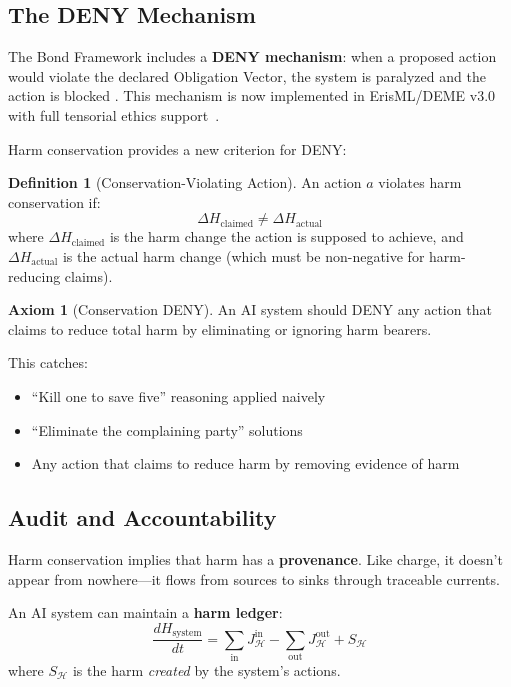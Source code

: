\documentclass[12pt,letterpaper]{article}
\theoremstyle{definition}
\newtheorem{definition}[theorem]{Definition}
\newtheorem{axiom}{Axiom}
\theoremstyle{remark}
\newcommand{\harm}{\mathcal{H}}
\begin{document}
\subsection{The DENY Mechanism}

The Bond Framework includes a \textbf{DENY mechanism}: when a proposed action would violate the declared Obligation Vector, the system is paralyzed and the action is blocked \cite{bond2025categorical}. This mechanism is now implemented in ErisML/DEME v3.0 with full tensorial ethics support~\cite{bond2026erisml}.

Harm conservation provides a new criterion for DENY:

\begin{definition}[Conservation-Violating Action]
An action $a$ violates harm conservation if:
\begin{equation}
\Delta H_{\text{claimed}} \neq \Delta H_{\text{actual}}
\end{equation}
where $\Delta H_{\text{claimed}}$ is the harm change the action is supposed to achieve, and $\Delta H_{\text{actual}}$ is the actual harm change (which must be non-negative for harm-reducing claims).
\end{definition}

\begin{axiom}[Conservation DENY]
An AI system should DENY any action that claims to reduce total harm by eliminating or ignoring harm bearers.
\end{axiom}

This catches:
\begin{itemize}
    \item ``Kill one to save five'' reasoning applied naively
    \item ``Eliminate the complaining party'' solutions
    \item Any action that claims to reduce harm by removing evidence of harm
\end{itemize}

\subsection{Audit and Accountability}

Harm conservation implies that harm has a \textbf{provenance}. Like charge, it doesn't appear from nowhere---it flows from sources to sinks through traceable currents.

An AI system can maintain a \textbf{harm ledger}:
\begin{equation}
\frac{d H_{\text{system}}}{dt} = \sum_{\text{in}} J_\harm^{\text{in}} - \sum_{\text{out}} J_\harm^{\text{out}} + S_\harm
\end{equation}
where $S_\harm$ is the harm \textit{created} by the system's actions.
\end{document}
